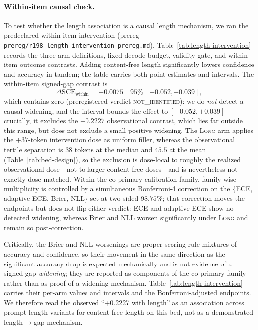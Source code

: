 \documentclass{article}
\begin{document}
\paragraph{Within-item causal check.}
To test whether the length association is a causal length mechanism, we ran the
predeclared within-item intervention
(prereg \nolinkurl{prereg/r198_length_intervention_prereg.md}).
Table~\ref{tab:length-intervention} records the three arm definitions, fixed decode
budget, validity gate, and within-item outcome contrasts.  Adding content-free length
significantly lowers confidence and accuracy in tandem; the table carries both point
estimates and intervals.  The
within-item signed-gap contrast is
\[
\Delta\mathrm{SCE}_{\text{within}}=-0.0075\quad 95\%\ [-0.052,+0.039],
\]
which contains zero (preregistered verdict \textsc{not\_identified}): we do
\emph{not} detect a causal widening, and the interval
bounds the effect to $[-0.052,+0.039]$---crucially, it excludes the $+0.2227$
observational contrast, which lies far outside this range, but does not exclude a
small positive widening.  The \textsc{Long} arm applies the $+37$-token
intervention dose as uniform filler,
whereas the observational tertile separation is $38$ tokens at the median and
$45.5$ at the mean (Table~\ref{tab:bed-design}), so the exclusion is dose-local to
roughly the realized observational dose---not to larger content-free doses---and is
nevertheless not exactly dose-matched.  Within the co-primary calibration family,
family-wise multiplicity is controlled by a simultaneous Bonferroni-4 correction on
the \{ECE, adaptive-ECE, Brier, NLL\} set at two-sided $98.75\%$; that correction
moves the endpoints but does not flip either verdict: ECE and adaptive-ECE show no
detected widening, whereas Brier and NLL worsen significantly under \textsc{Long}
and remain so post-correction.

Critically, the Brier and NLL worsenings are proper-scoring-rule mixtures of
accuracy and confidence, so their movement in the same direction as the significant
accuracy drop is expected mechanically and is not evidence of a signed-gap
\emph{widening}; they are reported as components of the co-primary family rather
than as proof of a widening mechanism.  Table~\ref{tab:length-intervention} carries
their per-arm values and intervals and the Bonferroni-adjusted endpoints.  We therefore read the
observed ``+0.2227 with length'' as an association across prompt-length variants for
content-free length on this bed, not as a demonstrated length$\to$gap mechanism.
\end{document}
